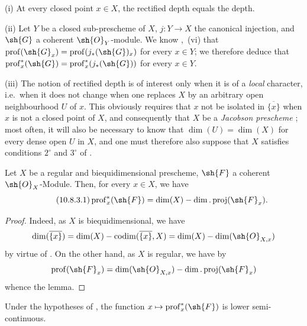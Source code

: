 \begin{remarks}[10.8.2]
\label{IV.10.8.2}
(i) At every closed point $x\in X$, the rectified depth equals the depth.

(ii) Let $Y$ be a closed sub-prescheme of $X$, $j:Y\to X$ the canonical injection, and $\sh{G}$ a coherent $\sh{O}_Y$-module.
We know ,~(vi) that $\operatorname{prof}(\sh{G}_x)=\operatorname{prof}(j_*(\sh{G})_x)$ for every $x\in Y$; we therefore deduce that $\operatorname{prof}^*_x(\sh{G})=\operatorname{prof}^*_x(j_*(\sh{G}))$ for every $x\in Y$.

(iii) The notion of rectified depth is of interest only when it is of a \emph{local} character, i.e.\ when it does not change when one replaces $X$ by an arbitrary open neighbourhood $U$ of $x$.
This obviously requires that $x$ not be isolated in $\overline{\{x\}}$ when $x$ is not a closed point of $X$, and consequently that $X$ be a \emph{Jacobson prescheme} ; most often, it will also be necessary to know that $\dim(U)=\dim(X)$ for every dense open $U$ in $X$, and one must therefore also suppose that $X$ satisfies conditions $2^\circ$ and $3^\circ$ of .
\end{remarks}

\begin{lemma}[10.8.3]
\label{IV.10.8.3}
Let $X$ be a regular and biequidimensional prescheme, $\sh{F}$ a coherent $\sh{O}_X$-Module.
Then, for every $x\in X$, we have
\begin{equation}
\label{IV.10.8.3.1}
\tag{10.8.3.1}
\operatorname{prof}^*_x(\sh{F})=\dim(X)-\dim.\operatorname{proj}(\sh{F}_x).
\end{equation}
\end{lemma}

\begin{proof}
Indeed, as $X$ is biequidimensional, we have 
\[
  \dim(\overline{\{x\}})=\dim(X)-\operatorname{codim}(\overline{\{x\}},X)=\dim(X)-\dim(\sh{O}_{X,x})
\]
by virtue of .
On the other hand, as $X$ is regular, we have by 
\[
  \operatorname{prof}(\sh{F}_x)=\dim(\sh{O}_{X,x})-\dim.\operatorname{proj}(\sh{F}_x)
\]
whence the lemma.
\end{proof}

\begin{corollary}[10.8.4]
\label{IV.10.8.4}
Under the hypotheses of , the function $x\mapsto\operatorname{prof}^*_x(\sh{F})$ is lower semi-continuous.
\end{corollary}

